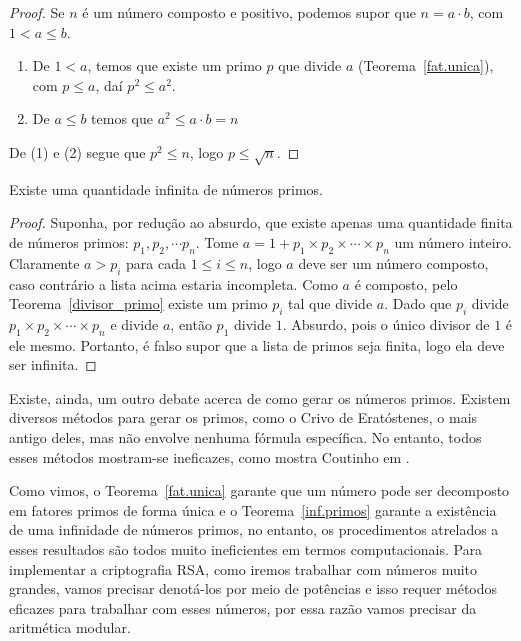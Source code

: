 \begin{proof}
Se $n$ \'e um n\'umero composto e positivo, podemos supor que $n=a\cdot b$, com $1<a\leq b$.
\begin{enumerate}
\item De $1<a$, temos que existe um primo $p$ que divide $a$ (Teorema~\ref{fat.unica}), com $p\leq a$, da\'i $p^2\leq a^2$.
\item De $a\leq b$ temos que $a^2\leq a\cdot b=n$
\end{enumerate}
De (1) e (2) segue que $p^2\leq n$, logo $p\leq\sqrt{n}$.
\end{proof}

\begin{Th}\label{inf.primos}
Existe uma quantidade infinita de n\'umeros primos.
\end{Th}

\begin{proof}
Suponha, por redu\c{c}\~ao ao absurdo, que existe apenas uma quantidade finita de n\'umeros primos: $p_1, p_2,\cdots p_n$. Tome $a=1+p_1\times p_2\times \cdots \times p_n$ um n\'umero inteiro. Claramente $a>p_i$ para cada $1\leq i\leq n$, logo $a$ deve ser um n\'umero composto, caso contr\'ario a lista acima estaria incompleta. Como $a$ \'{e} composto, pelo Teorema~\ref{divisor_primo} existe um primo $p_i$ tal que 
divide $a$. Dado que $p_i$ divide $p_1\times p_2\times \cdots \times p_n$ e divide $a$, ent\~ao $p_1$ divide $1$. Absurdo, pois o \'unico divisor de $1$ \'e ele mesmo. Portanto, \'e falso supor que a lista de primos seja finita, logo ela deve ser infinita.
\end{proof}

Existe, ainda, um outro debate acerca de como gerar os n\'umeros primos. Existem diversos m\'etodos para gerar os primos, como o Crivo 
de Erat\'ostenes, o mais antigo deles, mas n\~ao envolve nenhuma f\'ormula espec\'ifica. No entanto, todos esses 
m\'etodos mostram-se ineficazes, como mostra Coutinho em \cite{cou:2014}.

Como vimos, o Teorema~\ref{fat.unica} garante que um n\'umero pode ser decomposto
em fatores primos de forma \'unica e o Teorema~\ref{inf.primos} garante a exist\^{e}ncia de uma infinidade de n\'umeros primos, no entanto, 
os procedimentos atrelados a esses resultados s\~ao todos muito ineficientes em termos computacionais. Para implementar a criptografia RSA, como iremos trabalhar com n\'{u}meros muito grandes, vamos precisar denot\'{a}-los por meio de pot\^{e}ncias e isso requer m\'{e}todos 
eficazes para trabalhar com esses n\'{u}meros, por essa raz\~ao vamos precisar da aritm\'{e}tica modular.  


